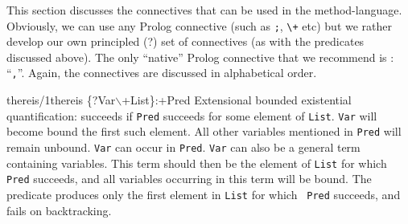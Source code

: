 This section discusses the connectives that can be used in the
method-language. Obviously, we can use any Prolog connective (such as
{\tt ;}, \verb'\+' etc) but we rather develop our own principled (?)
set of connectives (as with the predicates discussed above). The only
``native'' Prolog connective that we recommend is :
``{\tt ,}''. Again, the connectives are discussed in alphabetical
order.


\begin{predicate}{thereis/1}{thereis \{?Var$\backslash$+List\}:+Pred}%
Extensional bounded existential quantification: succeeds if {\tt Pred}
succeeds for some element of {\tt List}.  {\tt Var} will become bound
the first such element.  All other variables mentioned in {\tt Pred}
will remain unbound.  {\tt Var} can occur in {\tt Pred}.  {\tt Var}
can also be a general term containing variables. This term should then
be the element of {\tt List} for which {\tt Pred} succeeds, and all
variables occurring in this term will be bound.  The 
predicate produces only the first element in {\tt List} for which {\tt
Pred} succeeds, and fails on backtracking.
\end{predicate}

